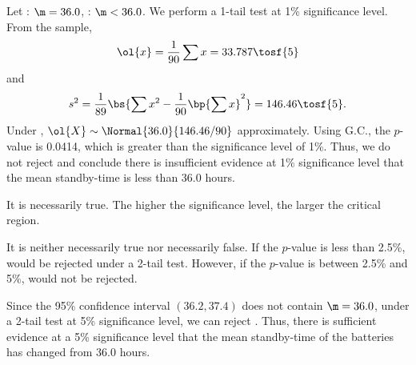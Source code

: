 \begin{solution}
    Let \nullhyp: $\m = 36.0$, \althyp: $\m < 36.0$. We perform a 1-tail test at 1\% significance level. From the sample, \[\ol{x} = \frac1{90} \sum x = 33.787 \tosf{5}\] and \[s^2 = \frac1{89} \bs{\sum x^2 - \frac1{90} \bp{\sum x}^2} = 146.46 \tosf{5}.\] Under \nullhyp, $\ol{X} \sim \Normal{36.0}{146.46/90}$ approximately. Using G.C., the $p$-value is 0.0414, which is greater than the significance level of 1\%. Thus, we do not reject \nullhyp{} and conclude there is insufficient evidence at 1\% significance level that the mean standby-time is less than 36.0 hours.

    \begin{ppart}
        It is necessarily true. The higher the significance level, the larger the critical region.
    \end{ppart}
    \begin{ppart}
        It is neither necessarily true nor necessarily false. If the $p$-value is less than 2.5\%, \nullhyp{} would be rejected under a 2-tail test. However, if the $p$-value is between 2.5\% and 5\%, \nullhyp{} would not be rejected.
    \end{ppart}
    \begin{ppart}
        Since the 95\% confidence interval $(36.2, 37.4)$ does not contain $\m = 36.0$, under a 2-tail test at 5\% significance level, we can reject \nullhyp{}. Thus, there is sufficient evidence at a 5\% significance level that the mean standby-time of the batteries has changed from 36.0 hours.
    \end{ppart}
\end{solution}

